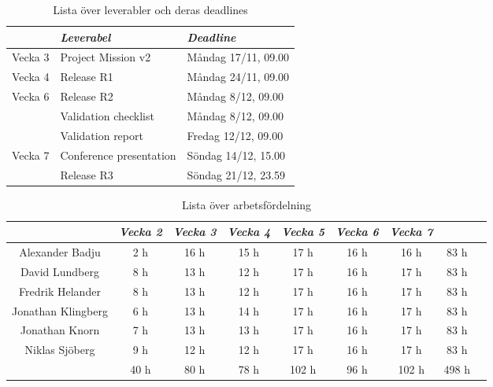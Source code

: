 \documentclass[10pt]{article}
\begin{document}
\begin{table}[htbp] %
  \begin{center}
    \begin{tabular}{l|ll}
      & \emph{Leverabel} & \emph{Deadline} \\ \hline
      Vecka 3      & Project Mission v2        & Måndag 17/11, 09.00 \\
      Vecka 4      & Release R1                & Måndag 24/11, 09.00 \\
      Vecka 6      & Release R2                & Måndag 8/12,  09.00 \\
                    & Validation checklist      & Måndag 8/12, 09.00 \\
                    & Validation report         & Fredag 12/12, 09.00 \\
      Vecka 7      & Conference presentation   & Söndag 14/12, 15.00 \\
                    & Release R3                & Söndag 21/12, 23.59 \\
     \hline               
    \end{tabular}
  \end{center}
  \caption{Lista över leverabler och deras deadlines}
\end{table}


\begin{table}[htbp]
    \begin{center}
        \begin{tabular}{ |c|c|c|c|c|c|c||c|c| }
        \hline
         & \emph{Vecka 2} & \emph{Vecka 3} & \emph{Vecka 4} & \emph{Vecka 5} &              \emph{Vecka 6} & \emph{Vecka 7} & \\
        \hline
        Alexander Badju & 2 h & 16 h & 15 h & 17 h & 16 h & 16 h & 83 h\\
        David Lundberg & 8 h & 13 h & 12 h & 17 h & 16 h & 17 h & 83 h\\
        Fredrik Helander & 8 h & 13 h & 12 h & 17 h & 16 h & 17 h & 83 h\\
        Jonathan Klingberg & 6 h & 13 h & 14 h & 17 h & 16 h & 17 h & 83 h\\
        Jonathan Knorn & 7 h & 13 h & 13 h & 17 h & 16 h & 17 h & 83 h\\
        Niklas Sjöberg & 9 h & 12 h & 12 h & 17 h & 16 h & 17 h & 83 h\\
        \hline
        \hline
         & 40 h & 80 h & 78 h & 102 h & 96 h & 102 h & 498 h\\
        \hline
        \end{tabular}
    \end{center}
    \caption{Lista över arbetsfördelning}
\end{table}
\end{document}
